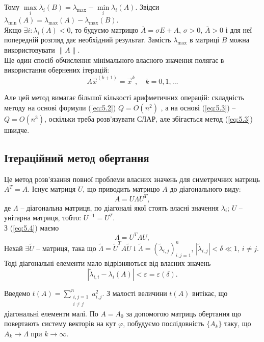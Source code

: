 \documentclass[12pt, a4paper]{article}
\theoremstyle{definition}
\newcommand{\Min}{\displaystyle\min\limits}
\newcommand{\Max}{\displaystyle\max\limits}
\newcommand{\Sum}{\displaystyle\sum\limits}
\renewcommand{\epsilon}{\varepsilon}
\renewcommand{\phi}{\varphi}
\numberwithin{equation}{section}
\begin{document}
\begin{enumerate}
	Тому $\Max_i \lambda_i (B) = \lambda_{\max} - \Min_i \lambda_i(A)$. Звідси $\lambda_{\min}(A) = \lambda_{\max}(A) - \lambda_{\max}(B)$. \\

	Якщо $\exists i: \lambda_i(A) < 0$, то будуємо матрицю $ \overline{A} = \sigma E + A$, $\sigma > 0$, $\overline{A} > 0$ і для неї попередній розгляд дає необхідний результат. Замість $\lambda_{\max}$ в матриці $B$ можна використовувати $\|A\|$. \\

	Ще один спосіб обчислення мінімального власного значення полягає в використання обернених ітерацій:
	\begin{equation}
		\label{eq:5.3}
		A \vec x^{(k+1)} = \vec x^k, \quad k = 0, 1, \ldots
	\end{equation}

	Але цей метод вимагає більшої кількості арифметичних операцій: складність методу на основі формули (\ref{eq:5.2}) $Q = O(n^2)$ , а на основі (\ref{eq:5.3}) -- $Q = O(n^3)$, оскільки треба розв'язувати СЛАР, але збігається метод (\ref{eq:5.3}) швидче.
\end{enumerate}

\subsection{Ітераційний метод обертання}
Це метод розв'язання повної проблеми власних значень для симетричних матриць $A^T = A$. Існує матриця $U$, що приводить матрицю $A$ до діагонального виду:
\begin{equation}
	\label{eq:5.4}
	A = U \Lambda U^T,
\end{equation}
де $\Lambda$ -- діагональна матриця, по діагоналі якої стоять власні значення $\lambda_i$; $U$ -- унітарна матриця, тобто: $U^{-1}=U^T$. \\

З (\ref{eq:5.4}) маємо
\begin{equation}
	\label{eq:5.5}
	\Lambda = U^T \Lambda U,
\end{equation}
Нехай $\exists \tilde U$ -- матриця, така що $\tilde \Lambda = \tilde U^T A \tilde U$ і $\tilde \Lambda = (\tilde \lambda_{i,j})_{i,j=1}^n$, $|\tilde \lambda_{i,j}| < \delta \ll 1$, $i \ne j$. \\

Тоді діагональні елементи мало відрізняються від власних значень \[ |\tilde \lambda_{i,i} - \lambda_i(A) | < \epsilon = \epsilon(\delta). \]

Введемо $t(A) = \Sum_{\substack{i, j = 1 \\ i \ne j}}^n a_{i,j}^2$. З малості величини $t(A)$ витікає, що діагональні елементи малі. По $A = A_0$ за допомогою матриць обертання %
що повертають систему векторів на кут $\phi$, побудуємо послідовність $\{A_k\}$ таку, що $A_k \to \Lambda$ при $k\to\infty$. \\
\end{document}
